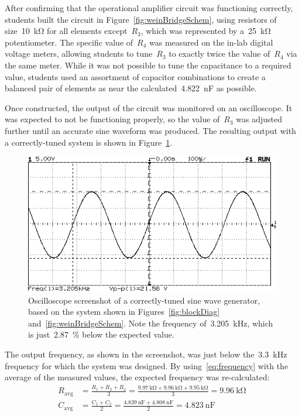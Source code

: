 After confirming that the operational amplifier circuit was functioning
correctly, students built the circuit in Figure~\ref{fig:weinBridgeSchem},
using resistors of size~\SI{10}{\kilo\ohm} for all elements except~$R_3$, which
was represented by a~\SI{25}{\kilo\ohm} potentiometer.  The specific value
of~$R_4$ was measured on the in-lab digital voltage meters, allowing students
to tune~$R_3$ to exactly twice the value of~$R_4$ via the same meter.  While it
was not possible to tune the capacitance to a required value, students used an
assortment of capacitor combinations to create a balanced pair of elements as
near the calculated~\SI{4.822}{\nano\farad} as possible.

Once constructed, the output of the circuit was monitored on an oscilloscope.
It was expected to not be functioning properly, so the value of~$R_3$ was
adjusted further until an accurate sine waveform was produced.  The resulting
output with a correctly-tuned system is shown in Figure~\ref{fig:goodShot}.
%
\begin{figure}[H]
	\centering
	\includegraphics[width=.6\textwidth]{img/shot/pt2shot.png}
	\parbox{.6\textwidth}{
	\caption[Oscilloscope Screenshot --- Functioning System]{Oscilloscope
	screenshot of a correctly-tuned sine wave generator, based on the system
	shown in Figures~\ref{fig:blockDiag} and~\ref{fig:weinBridgeSchem}.  Note
	the frequency of~\SI{3.205}{\kilo\hertz}, which is just~\SI{2.87}{\percent}
	below the expected value.}
	\label{fig:goodShot}}
\end{figure}
%
The output frequency, as shown in the screenshot, was just below
the~\SI{3.3}{\kilo\hertz} frequency for which the system was designed.  By
using~\eqref{eq:frequency} with the average of the measured values, the
expected frequency was re-calculated:
%
\begin{align*}
	R_\text{avg} &= \frac{R_1 + R_2 + R_4}{3}
	             = \frac{\SI{9.97}{\kilo\ohm} + \SI{9.96}{\kilo\ohm} + \SI{9.95}{\kilo\ohm}}{3}
				 = \SI{9.96}{\kilo\ohm}\\
	C_\text{avg} &= \frac{C_1 + C_2}{2}
				 = \frac{\SI{4.839}{\nano\farad} + \SI{4.808}{\nano\farad}}{2}
				 = \SI{4.823}{\nano\farad}
\end{align*}
